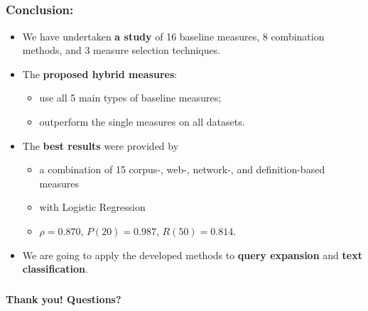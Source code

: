 \documentclass{beamer}
\begin{document}
\subsection{}

\begin{frame}
\frametitle{Conclusion:}

\begin{itemize}
  

\item We have undertaken \textbf{a study} of 16 baseline measures, 8
combination methods, and 3 measure selection techniques.

\item The \textbf{proposed hybrid measures}:

\begin{itemize}
  \item use all 5 main types of baseline measures;
  \item outperform the single measures on all datasets.
\end{itemize}  

  
\item The \textbf{best results} were provided by
\begin{itemize}
  \item  a combination of 15  corpus-, web-, network-, and definition-based measures
\item with Logistic Regression 
\item $\rho= 0.870$, $P(20)=0.987$, $R(50)=0.814$.
\end{itemize}

\pause

\item We are going to apply the
developed methods to \textbf{query expansion} and \textbf{text classification}.
 
\end{itemize}

\end{frame}

\begin{frame}
\frametitle{}

\Huge \bf Thank you! Questions?
\end{frame}
\end{document}
